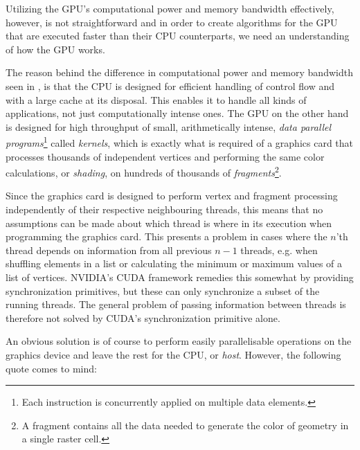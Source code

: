 
Utilizing the GPU's computational power and memory bandwidth effectively,
however, is not straightforward and in order to create algorithms for the GPU
that are executed faster than their CPU counterparts, we need an understanding
of how the GPU works.

The reason behind the difference in computational power and memory bandwidth
seen in , is that the CPU is designed for efficient
handling of control flow and with a large cache at its disposal. This enables it
to handle all kinds of applications, not just computationally intense ones. The
GPU on the other hand is designed for high throughput of small, arithmetically
intense, \textit{data parallel programs}\footnote{Each instruction is
  concurrently applied on multiple data elements.} called \textit{kernels},
which is exactly what is required of a graphics card that processes thousands of
independent vertices and performing the same color calculations, or
\textit{shading}, on hundreds of thousands of \textit{fragments}\footnote{A
  fragment contains all the data needed to generate the color of geometry in a
  single raster cell.}.

Since the graphics card is designed to perform vertex and fragment processing
independently of their respective neighbouring threads, this means that no
assumptions can be made about which thread is where in its execution when
programming the graphics card. This presents a problem in cases where the $n$'th
thread depends on information from all previous $n-1$ threads, e.g. when
shuffling elements in a list or calculating the minimum or maximum values of a
list of vertices. NVIDIA's CUDA framework remedies this somewhat by providing
synchronization primitives, but these can only synchronize a subset of the
running threads. The general problem of passing information between threads is
therefore not solved by CUDA's synchronization primitive alone.


An obvious solution is of course to perform easily parallelisable operations on
the graphics device and leave the rest for the CPU, or \textit{host}. However,
the following quote comes to mind:


